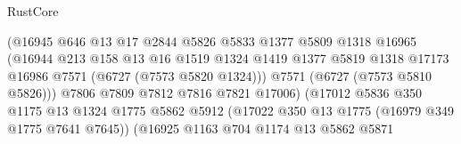 \begin{lexlean}{RustCore}
\begin{coremodule}
                                          (@16945
                                            @646
                                            @13
                                            @17
                                            @2844
                                            @5826
                                            @5833
                                            @1377
                                            @5809
                                            @1318
                                            @16965
                                            (@16944
                                              @213
                                              @158
                                              @13
                                              @16
                                              @1519
                                              @1324
                                              @1419
                                              @1377
                                              @5819
                                              @1318
                                              @17173
                                              @16986
                                              @7571
                                              (@6727 (@7573 @5820 @1324)))
                                            @7571
                                            (@6727 (@7573 @5810 @5826)))
                                          @7806
                                          @7809
                                          @7812
                                          @7816
                                          @7821
                                          @17006)
                                        (@17012
                                          @5836
                                          @350
                                          @1175
                                          @13
                                          @1324
                                          @1775
                                          @5862
                                          @5912
                                          (@17022 @350 @13 @1775 (@16979 @349 @1775 @7641 @7645))
                                          (@16925
                                            @1163
                                            @704
                                            @1174
                                            @13
                                            @5862
                                            @5871

\end{coremodule}
\end{lexlean}
